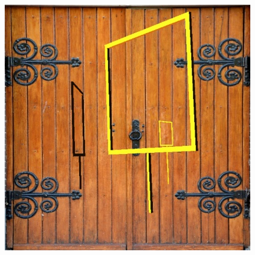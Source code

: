 \documentclass{article}
\begin{document}
\begin{figure}[h]
	\centering
	\begin{minipage}{0.24\textwidth}
		\centering
		\includegraphics[width=\textwidth]{fig/sample}
		

\end{minipage}
\end{figure}
\end{document}

